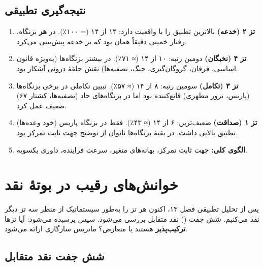 \documentclass[12pt,a4paper]{book}
\newcommand{\keyword}[1]{\textbf{\textcolor{cPrimary}{#1}}}
\newcommand{\en}[1]{\lr{\textit{#1}}}
\begin{document}
\section{نتیجه‌گیری تطبیقی}

\begin{principleBox}
\begin{enumerate}[label=\textcolor{cPrimary}{\bfseries\arabic*.}, rightmargin=2em]
    \item \textbf{تز ۲ (خدعه)} بالاترین تطبیق را با واقعیت دارد: ۱۴ از ۱۴ (= ۱۰۰٪). در \keyword{هر} بزنگاه، رفتار خمینی دقیقاً همان بود که تز خدعه پیش‌بینی می‌کرد.
    \item \textbf{تز ۴ (نخبگان)} دومین رتبه: ۱۰ از ۱۴ (≈ ۷۱٪). در بیشتر بزنگاه‌ها (به‌ویژه قانون اساسی، فرقان، گروگان‌گیری، جنگ، تصفیه‌ها) نقش حلقهٔ درونی آشکار بود.
    \item \textbf{تز ۳ (تکامل)} سومین رتبه: ۸ از ۱۴ (≈ ۵۷٪). تبیین تکاملی در برخی بزنگاه‌ها (پاریس، ترور مطهری) قانع‌کننده بود اما در بزنگاه‌های حاد (تصفیه‌ها، کشتار ۶۷) ضعیف عمل کرد.
    \item \textbf{تز ۱ (صداقت)} ضعیف‌ترین: ۶ از ۱۴ (≈ ۴۳٪). فقط در بزنگاه پاریس (خود وعده‌ها) تطبیق بالایی داشت. در بقیهٔ بزنگاه‌ها ناتوان از توضیح جهت ثابت تمرکز بود.
    \item \keyword{الگوی کلی:} جهت ثابت تمرکز، بهانه‌های متغیر، سرعت فزاینده، داوری یکسویه.
\end{enumerate}
\end{principleBox}


\chapter{خوانش‌های رقیب در بوتهٔ نقد}
\label{chap:85f087}


\begin{infoBox}
پس از تحلیل تطبیقی فصل ۱۳، اکنون هر تز را به‌طور سیستماتیک از منظر سه تز دیگر نقد می‌کنیم. شش جفت (\en{pair}) نقد متقابل بررسی می‌شود. سپس پرسیده می‌شود: آیا تزها \keyword{ترکیب‌پذیر} هستند یا متعارض؟ ماتریس سازگاری ارائه می‌شود.
\end{infoBox}

\section{شش جفت نقد متقابل}
\end{document}
